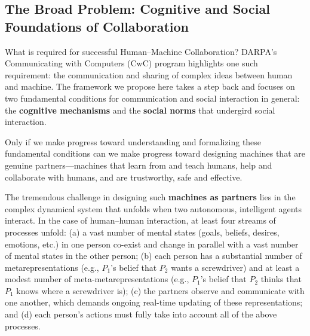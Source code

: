 \documentclass[12pt]{article}
\begin{document}
\vspace{2mm}
\subsection*{The Broad Problem: Cognitive and Social Foundations of 
Collaboration}

\noindent What is required for successful Human--Machine Collaboration?
DARPA's Communicating with Computers (CwC) program highlights one such
requirement: the communication and sharing of complex ideas between
human and machine.  The framework we propose here takes a step back
and focuses on two fundamental conditions for communication and social interaction in general: the
\textbf{cognitive mechanisms} and the \textbf{social norms} that undergird social interaction.


Only if we make progress toward understanding and formalizing these fundamental 
conditions can we make progress toward designing machines that are genuine 
partners---machines that learn from and teach humans, help and collaborate with 
humans, and are trustworthy, safe and effective.  

The tremendous challenge in designing such {\bf machines as partners}
lies in the complex dynamical system that unfolds when two autonomous,
intelligent agents interact.  In the case of human--human interaction,
at least four streams of processes unfold: (a) a vast number of mental
states (goals, beliefs, desires, emotions, etc.) in one person
co-exist and change in parallel with a vast number of mental states in
the other person; (b) each person has a substantial number of
metarepresentations (e.g., $P_1$'s belief that $P_2$ wants a screwdriver) and
at least a modest number of meta-metarepresentations (e.g., $P_1$'s
belief that $P_2$ thinks that $P_1$ knows where a
screwdriver is); (c) the partners observe and communicate with one
another, which demands ongoing real-time updating of these
representations; and (d) each person's actions must fully take into
account all of the above processes.
\end{document}
